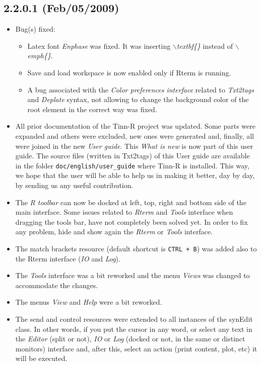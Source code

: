 \subsection*{2.2.0.1 (Feb/05/2009)}
\begin{itemize}
  \item Bug(s) fixed:
    \begin{itemize}
      \item Latex font \textit{Enphase} was fixed. It was inserting
        \textit{$\backslash$textbf\{\}} instead of
        \textit{$\backslash$emph\{\}}.
      \item Save and load workspace is now enabled only if Rterm is
        running.
      \item A bug associated with the \textit{Color preferences interface}
        related to \textit{Txt2tags} and \textit{Deplate} syntax, not
        allowing to change the background color of the root element in
        the correct way was fixed.
    \end{itemize}
  \item All prior documentation of the Tinn-R project was updated. Some
    parts were expanded and others were excluded, new ones were generated and,
    finally, all were joined in the new \textit{User guide}. This
    \textit{What is new} is now part of this user guide. The source
    files (written in Txt2tags) of this User guide are available in the
    folder \texttt{doc/english/user\_guide} where Tinn-R is installed.
    This way, we hope that the user will be able to help us in making
    it better, day by day, by sending us any useful contribution.
  \item The \textit{R toolbar} can now be docked at left, top, right and
    bottom side of the main interface. Some issues related to \textit{Rterm}
    and \textit{Tools} interface when dragging the \RR{} tools bar, have
    not completely been solved yet. In order to fix any problem, hide and
    show again the \textit{Rterm} or \textit{Tools} interface.
  \item The match brackets resource (default shortcut is \texttt{CTRL + B})
    was added also to the Rterm interface (\textit{IO} and \textit{Log}).
  \item The \textit{Tools} interface was a bit reworked and the menu
    \textit{Views} was changed to accommodate the changes.
  \item The menus \textit{View} and \textit{Help} were a bit reworked.
  \item The send and control \RR{} resources were extended to all
    instances of the synEdit class. In other words, if you put the
    cursor in any word, or select any text in the \textit{Editor}
    (split or not), \textit{IO} or \textit{Log} (docked or not, in the
    same or distinct monitors) interface and, after this, select an
    action (print content, plot, etc) it will be executed.
\end{itemize}
